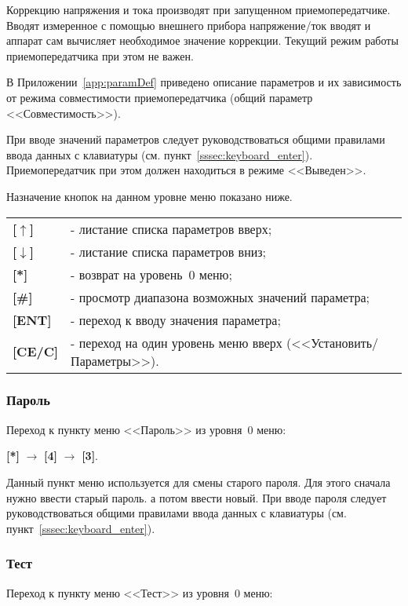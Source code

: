 Коррекцию напряжения и тока производят при запущенном приемопередатчике. Вводят измеренное с помощью внешнего прибора напряжение/ток вводят и аппарат сам вычисляет необходимое значение коррекции. Текущий режим работы приемопередатчика при этом не важен.

В Приложении~\ref{app:paramDef} приведено описание параметров и их зависимость от режима совместимости приемопередатчика (общий параметр <<Совместимость>>).

При вводе значений параметров следует руководствоваться общими правилами ввода данных с клавиатуры (см. пункт~\ref{sssec:keyboard_enter}). Приемопередатчик при этом должен находиться в режиме <<Выведен>>.

Назначение кнопок на данном уровне меню показано ниже.
\begin{center}
	\begin{tabular}{p{2cm} p{15cm}}
		\textbf{[$\uparrow$]}  	& - листание списка параметров вверх; \tabularnewline
		\textbf{[$\downarrow$]} & - листание списка параметров вниз; \tabularnewline
		\textbf{[*]} 			& - возврат на уровень~0 меню; \tabularnewline
		\textbf{[\#]} 			& - просмотр диапазона возможных значений параметра; \tabularnewline
		\textbf{[ENT]} 			& - переход к вводу значения параметра; \tabularnewline
		\textbf{[CE/C]} 		& - переход на один уровень меню вверх (<<Установить/Параметры>>). \tabularnewline				
	\end{tabular}
\end{center} 


\subsubsection{Пароль}	\label{sssec:password}

Переход к пункту меню <<Пароль>> из уровня~0 меню: 

\textbf{[*]} $\rightarrow$ \textbf{[4]} $\rightarrow$ \textbf{[3]}.

Данный пункт меню используется для смены старого пароля. Для этого сначала нужно ввести старый пароль. а потом ввести новый. При вводе пароля следует руководствоваться общими правилами ввода данных с клавиатуры (см. пункт~\ref{sssec:keyboard_enter}).


\subsubsection{Тест}	\label{sssec:test}

Переход к пункту меню <<Тест>> из уровня~0 меню: 

